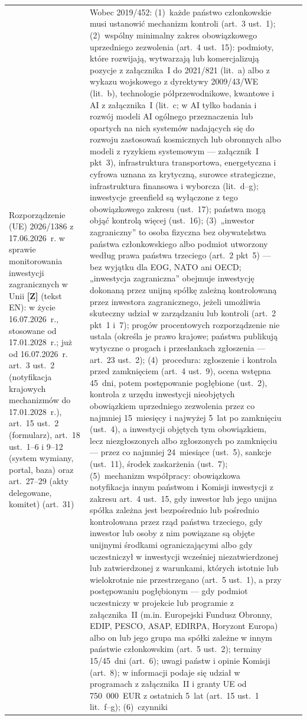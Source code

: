 \documentclass[12pt,a4paper]{report}
\newcommand{\Wiar}[1]{\textbf{[#1]}}
\begin{document}
\begin{longtable}{@{}p{3.1cm} p{3.7cm} p{3.3cm} p{4.4cm}@{}}
Rozporządzenie (UE) 2026/1386 z 17.06.2026~r. w sprawie monitorowania inwestycji zagranicznych w Unii \Wiar{Z} (tekst EN): w życie 16.07.2026~r., stosowane od 17.01.2028~r.; już od 16.07.2026~r. art.~3 ust.~2 (notyfikacja krajowych mechanizmów do 17.01.2028~r.), art.~15 ust.~2 (formularz), art.~18 ust.~1--6 i 9--12 (system wymiany, portal, baza) oraz art.~27--29 (akty delegowane, komitet) (art.~31) & Wobec 2019/452: (1)~każde państwo członkowskie musi ustanowić mechanizm kontroli (art.~3 ust.~1); (2)~wspólny minimalny zakres obowiązkowego uprzedniego zezwolenia (art.~4 ust.~15): podmioty, które rozwijają, wytwarzają lub komercjalizują pozycje z załącznika~I do 2021/821 (lit.~a) albo z wykazu wojskowego z dyrektywy 2009/43/WE (lit.~b), technologie półprzewodnikowe, kwantowe i AI z załącznika~I (lit.~c; w AI tylko badania i rozwój modeli AI ogólnego przeznaczenia lub opartych na nich systemów nadających się do rozwoju zastosowań kosmicznych lub obronnych albo modeli z ryzykiem systemowym --- załącznik~I pkt~3), infrastruktura transportowa, energetyczna i cyfrowa uznana za krytyczną, surowce strategiczne, infrastruktura finansowa i wyborcza (lit.~d--g); inwestycje greenfield są wyłączone z tego obowiązkowego zakresu (ust.~17); państwa mogą objąć kontrolą więcej (ust.~16); (3)~„inwestor zagraniczny” to osoba fizyczna bez obywatelstwa państwa członkowskiego albo podmiot utworzony według prawa państwa trzeciego (art.~2 pkt~5) --- bez wyjątku dla EOG, NATO ani OECD; „inwestycja zagraniczna” obejmuje inwestycję dokonaną przez unijną spółkę zależną kontrolowaną przez inwestora zagranicznego, jeżeli umożliwia skuteczny udział w zarządzaniu lub kontroli (art.~2 pkt~1 i~7); progów procentowych rozporządzenie nie ustala (określa je prawo krajowe; państwa publikują wytyczne o progach i przesłankach zgłoszenia --- art.~23 ust.~2); (4)~procedura: zgłoszenie i kontrola przed zamknięciem (art.~4 ust.~9), ocena wstępna 45~dni, potem postępowanie pogłębione (ust.~2), kontrola z urzędu inwestycji nieobjętych obowiązkiem uprzedniego zezwolenia przez co najmniej 15~miesięcy i najwyżej 5~lat po zamknięciu (ust.~4), a inwestycji objętych tym obowiązkiem, lecz niezgłoszonych albo zgłoszonych po zamknięciu --- przez co najmniej 24~miesiące (ust.~5), sankcje (ust.~11), środek zaskarżenia (ust.~7); (5)~mechanizm współpracy: obowiązkowa notyfikacja innym państwom i Komisji inwestycji z zakresu art.~4 ust.~15, gdy inwestor lub jego unijna spółka zależna jest bezpośrednio lub pośrednio kontrolowana przez rząd państwa trzeciego, gdy inwestor lub osoby z nim powiązane są objęte unijnymi środkami ograniczającymi albo gdy uczestniczył w inwestycji wcześniej niezatwierdzonej lub zatwierdzonej z warunkami, których istotnie lub wielokrotnie nie przestrzegano (art.~5 ust.~1), a przy postępowaniu pogłębionym --- gdy podmiot uczestniczy w projekcie lub programie z załącznika~II (m.in. Europejski Fundusz Obronny, EDIP, PESCO, ASAP, EDIRPA, Horyzont Europa) albo on lub jego grupa ma spółki zależne w innym państwie członkowskim (art.~5 ust.~2); terminy 15/45~dni (art.~6); uwagi państw i opinie Komisji (art.~8); w informacji podaje się udział w programach z załącznika~II i granty UE od 750~000~EUR z ostatnich 5~lat (art.~15 ust.~1 lit.~f--g); (6)~czynniki 
\end{longtable}
\end{document}

